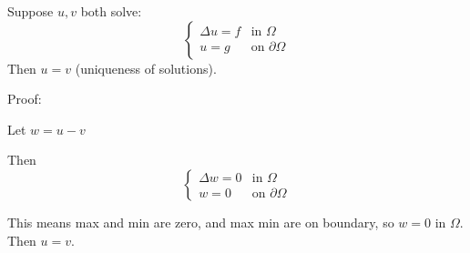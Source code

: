\documentclass[main.tex]{subfiles}
\begin{document}
Suppose $u, v$ both solve:
$$
\begin{cases}
    \Delta u = f & \textrm{in } \Omega \\
    u = g & \textrm{on } \partial \Omega
\end{cases}
$$
Then $u = v$ (uniqueness of solutions).

Proof:

Let $w = u - v$

Then $$
\begin{cases}
\Delta w = 0 & \textrm{in } \Omega \\
w = 0 & \textrm{on } \partial \Omega
\end{cases}$$

This means max and min are zero, and max min are on boundary, so $w = 0$ in $\Omega$. Then $u = v$.
\end{document}
